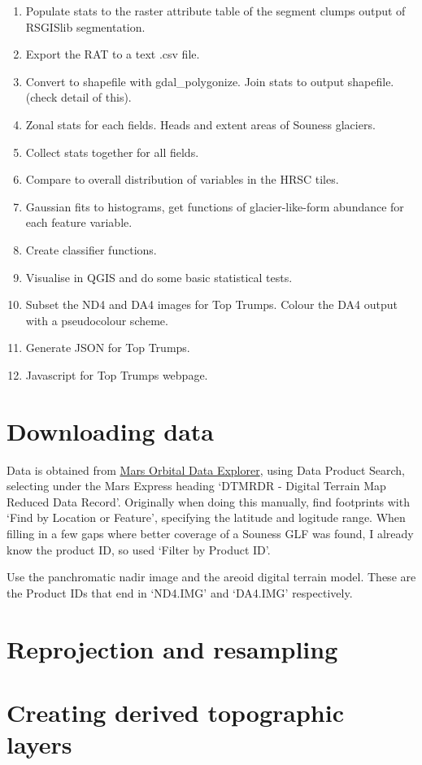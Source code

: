 \documentclass[a4paper,12pt]{article}
\begin{document}
\begin{enumerate}
 \item Populate stats to the raster attribute table of the segment clumps output of RSGISlib segmentation.
 \item Export the RAT to a text .csv file. 
 \item Convert to shapefile with gdal\_polygonize. Join stats to output shapefile. (check detail of this). 
 \item Zonal stats for each fields. Heads and extent areas of Souness glaciers.
 \item Collect stats together for all fields.
 \item Compare to overall distribution of variables in the HRSC tiles.
 \item Gaussian fits to histograms, get functions of glacier-like-form abundance for each feature variable.
 \item Create classifier functions.
 \item Visualise in QGIS and do some basic statistical tests.
 \item Subset the ND4 and DA4 images for Top Trumps. Colour the DA4 output with a pseudocolour scheme.
 \item Generate JSON for Top Trumps.
 \item Javascript for Top Trumps webpage.
\end{enumerate}

\section{Downloading data}
Data is obtained from \href{http://ode.rsl.wustl.edu/mars/}{Mars Orbital Data Explorer}, using Data Product Search, selecting under the Mars Express heading `DTMRDR - Digital Terrain Map Reduced Data Record'. Originally when doing this manually, find footprints with `Find by Location or Feature', specifying the latitude and logitude range. When filling in a few gaps where better coverage of a Souness GLF was found, I already know the product ID, so used `Filter by Product ID'.

Use the panchromatic nadir image and the areoid digital terrain model. These are the Product IDs that end in `ND4.IMG' and `DA4.IMG' respectively.
\section{Reprojection and resampling}
\section{Creating derived topographic layers}
\end{document}
